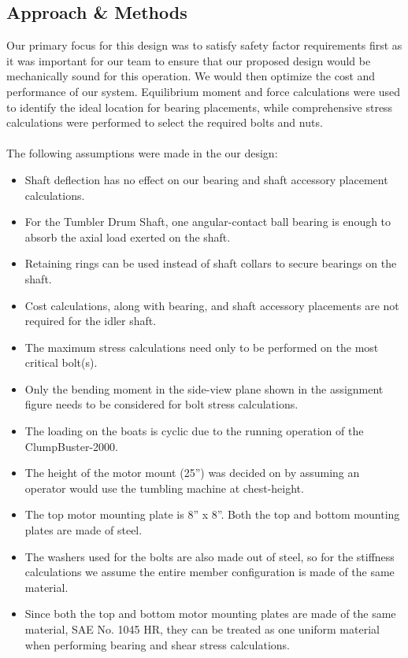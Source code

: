 \documentclass[letterpaper,12pt]{article}
\begin{document}
\subsection{Approach \& Methods}
Our primary focus for this design was to satisfy safety factor requirements first as it was important for our team to ensure that our proposed design would be mechanically sound for this operation. We would then optimize the cost and performance of our system. Equilibrium moment and force calculations were used to identify the ideal location for bearing placements, while comprehensive stress calculations were performed to select the required bolts and nuts.\\\\
The following assumptions were made in the our design:
\begin{itemize}
    \itemsep0em
    \item Shaft deflection has no effect on our bearing and shaft accessory placement calculations.
    \item For the Tumbler Drum Shaft, one angular-contact ball bearing is enough to absorb the axial load exerted on the shaft.
    \item Retaining rings can be used instead of shaft collars to secure bearings on the shaft.
    \item Cost calculations, along with bearing, and shaft accessory placements are not required for the idler shaft.
    \item The maximum stress calculations need only to be performed on the most critical bolt(s).
    \item Only the bending moment in the side-view plane shown in the assignment figure needs to be considered for bolt stress calculations.
    \item The loading on the boats is cyclic due to the running operation of the ClumpBuster-2000.
    \item The height of the motor mount (25'') was decided on by assuming an operator would use the tumbling machine at chest-height.
    \item The top motor mounting plate is 8'' x 8''. Both the top and bottom mounting plates are made of steel.
    \item The washers used for the bolts are also made out of steel, so for the stiffness calculations we assume the entire member configuration is made of the same material.
    \item Since both the top and bottom motor mounting plates are made of the same material, SAE No. 1045 HR, they can be treated as one uniform material when performing bearing and shear stress calculations.
\end{itemize}
\end{document}
